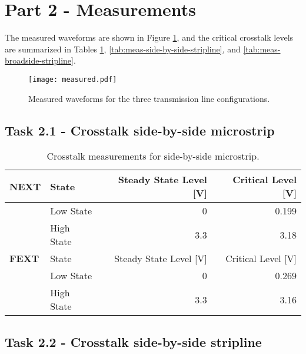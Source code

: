 \documentclass[../main.tex]{subfiles}
\begin{document}
\section{Part 2 - Measurements}

The measured waveforms are shown in Figure \ref{fig:meas-waveforms}, and the critical crosstalk levels are summarized in Tables \ref{tab:meas-side-by-side-microstrip}, \ref{tab:meas-side-by-side-stripline}, and \ref{tab:meas-broadside-stripline}.

\begin{figure}[h]
    \centering
    \texttt{[image: measured.pdf]}
    \caption{Measured waveforms for the three transmission line configurations.}
    \label{fig:meas-waveforms}
\end{figure}

\subsection{Task 2.1 - Crosstalk side-by-side microstrip}

\begin{table}[h]
    \centering
    \begin{tabular}{l l|r r}
        \toprule[1pt]
        \textbf{NEXT} & State & Steady State Level [V] & Critical Level [V] \\
        \midrule
        & Low State & 0 & 0.199 \\
        & High State & 3.3 & 3.18 \\
        \midrule[1pt]
        \textbf{FEXT} & State & Steady State Level [V] & Critical Level [V] \\
        \midrule
        & Low State & 0 & 0.269 \\
        & High State & 3.3 & 3.16 \\
        \bottomrule[1pt]
    \end{tabular}
    \caption{Crosstalk measurements for side-by-side microstrip.}
    \label{tab:meas-side-by-side-microstrip}
\end{table}

\subsection{Task 2.2 - Crosstalk side-by-side stripline}
\end{document}
